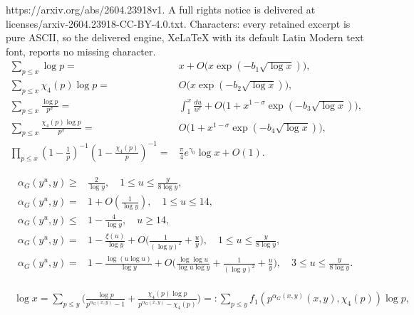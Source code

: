 \documentclass[10pt,a4paper]{amsart}
\begin{document}
https://arxiv.org/abs/2604.23918v1. A full rights notice is delivered at licenses/arxiv-2604.23918-CC-BY-4.0.txt. Characters: every retained excerpt is pure ASCII, so the delivered engine, XeLaTeX with its default Latin Modern text font, reports no missing character.
\begin{align}
\label{merten2-0}
\sum_{p\le x} \log p =& 
  x+O\Big(x \exp(-b_1\sqrt{\log x})\Big), \\
\label{merten2}
\sum_{p\le x} \chi_4(p)\log p =&  
  O\Big(x \exp(-b_2\sqrt{\log x})\Big),  \\
\label{sumpsigmalogp}
\sum_{p\le x} \frac{\log p}{p^{\sigma}} =& \int^{x}_1\frac {du}{u^{\sigma}}+ O\Big(1+x^{1-\sigma}\exp(-b_3\sqrt{\log x})\Big), \\
\label{sumpsigmalogpchi}
\sum_{p\le x} \frac{\chi_4(p)\log p}{p^{\sigma}} =& O\Big(1+x^{1-\sigma}\exp(-b_4\sqrt{\log x})\Big), \\
\label{merten4}
 \prod_{p\le x}(1-\frac {1}{p})^{-1}(1-\frac {\chi_4(p)}{p})^{-1}=& \frac {\pi}{4}e^{\gamma_0}\log x+O(1).
\end{align}

\begin{align}
\label{alphalower}
   \alpha_G(y^u,y)\geq &\frac 2{\log y}, \quad 1 \leq u \leq \frac {y}{8\log y}, \\
\label{alphausmall}
   \alpha_G(y^u,y) = & 1+O(\frac {1}{\log y}),  \quad 1 \leq u \leq 14, \\
\label{alphaupper}
   \alpha_G(y^u,y)\leq & 1-\frac {4}{\log y},  \quad u \geq 14, \\  
\label{equ: Saddle point approx in intro}
\alpha_G(y^u,y) = & 1 - \frac{\xi(u)}{\log y} + O \biggl( \frac{1}{(\log y)^2}+\frac {u}{y}\biggr), \quad 1 \leq u \leq \frac {y}{8\log y}, \\
\label{equ: Saddle point approx in intro1}
  \alpha_G(y^u,y)=&  1 - \frac{\log(u\log u)}{\log y} + O \biggl( \frac{\log\log u}{\log u\log y}+\frac{1}{(\log y)^2}+\frac {u}{y}\biggr), \quad 3 \leq u \leq \frac {y}{8\log y}.
\end{align}

\begin{align}
\label{alpharel}
\begin{split}
 \log x =\sum_{p \leq y} \Big(\frac {\log p}{p^{\alpha_G (x,y)}-1}+\frac {\chi_4(p)\log p}{p^{\alpha_G  (x,y)}-\chi_4(p)}\Big) =:\sum_{p \leq y} f_1(p^{\alpha_G  (x,y)}  (x,y), \chi_4(p))\log p, 
\end{split}
\end{align}     
\end{document}
